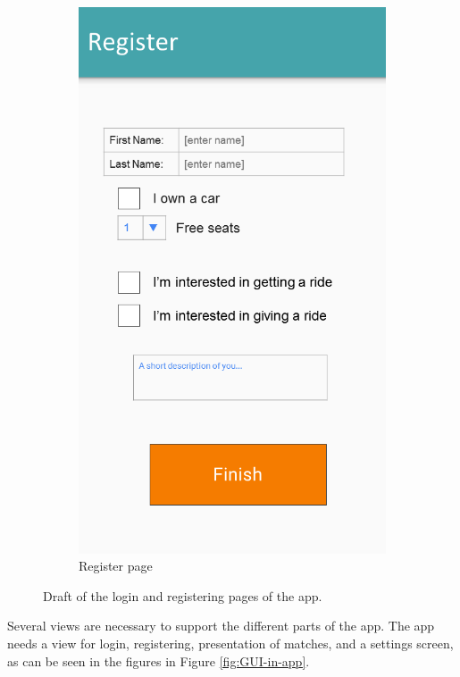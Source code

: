 \begin{figure}[h!]
\begin{subfigure}[b]{0.3\textwidth}
	 	\includegraphics[width=\textwidth]{figures/GUI-register.png}
	 	\caption{Register page}
	 	\label{fig:GUI-register}
	 \end{subfigure}
	 \caption{Draft of the login and registering pages of the app.}\label{fig:GUI-firstrun}
\end{figure}

Several views are necessary to support the different parts of the app. 
The app needs a view for login, registering, presentation of matches, and a settings screen, as can be seen in the figures in Figure \ref{fig:GUI-in-app}.

